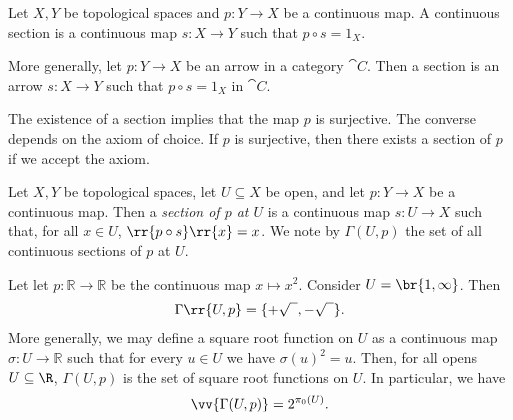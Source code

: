 \documentclass{article}
\begin{document}
\begin{definition}
  Let $X,Y$ be topological spaces and $p:Y\to X$ be a continuous map. A continuous section
  is a continuous map $s:X\to Y$ such that $p \circ s = 1_X$.

  More generally, let $p:Y\to X$ be an arrow in a category $\cat{C}$. Then a section
  is an arrow $s:X\to Y$ such that $p\circ s=1_X$ in $\cat{C}$.
\end{definition}

\begin{remark}\label{remark:continuity_and_sections}
  The existence of a section implies that the map $p$ is surjective. The converse
  depends on the axiom of choice. If $p$ is surjective, then there exists a section
  of $p$ if we accept the axiom.
\end{remark}

\begin{definition}
  Let $X,Y$ be topological spaces, let $U\subseteq X$ be open, and let $p:Y\to X$ be
  a continuous map. Then a \emph{section of $p$ at $U$} is a continuous map
  $s:U\to X$ such that, for all $x\in U$, $\rr{p\circ s}\rr{x}=x$.
  We note by $\Gamma(U,p)$ the set of all continuous sections of $p$ at $U$.
\end{definition}

\begin{example}
  Let let $p : \mathbb{R} \to \mathbb{R}$ be the continuous map $x \mapsto x^2$.
  Consider $U = \br{1,\infty}$. Then
  \begin{align*}
    \Gamma\rr{U,p} = \{+\sqrt{\phantom{a}}, -\sqrt{\phantom{a}}\}.
  \end{align*}
  More generally, we may define a square root function on $U$ as a continuous map
  $\sigma  : U \to \mathbb{R}$ such that for every  $u \in U$ we have $\sigma(u)^2 = u$.
  Then, for all opens $U\subseteq\R$, $\Gamma(U,p)$ is the set of square root
  functions on $U$. In particular, we have
  \begin{align*}
    \vv{\Gamma(U,p)} = 2^{\pi_0(U)}.
  \end{align*}
\end{example}
\end{document}

